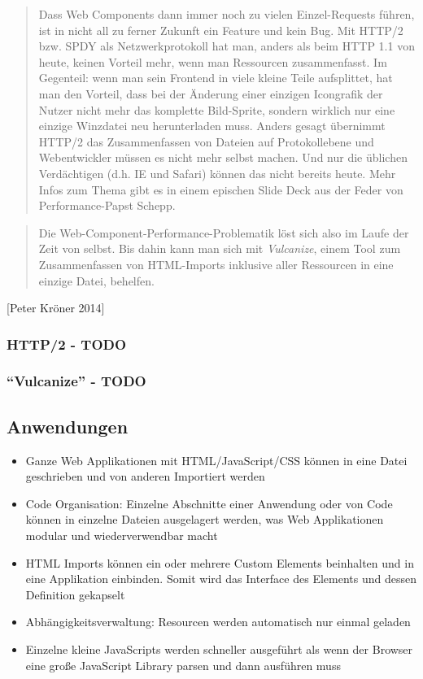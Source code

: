 \begin{quote}
Dass Web Components dann immer noch zu vielen Einzel-Requests führen,
ist in nicht all zu ferner Zukunft ein Feature und kein Bug. Mit HTTP/2
bzw. SPDY als Netzwerkprotokoll hat man, anders als beim HTTP 1.1 von
heute, keinen Vorteil mehr, wenn man Ressourcen zusammenfasst. Im
Gegenteil: wenn man sein Frontend in viele kleine Teile aufsplittet, hat
man den Vorteil, dass bei der Änderung einer einzigen Icongrafik der
Nutzer nicht mehr das komplette Bild-Sprite, sondern wirklich nur eine
einzige Winzdatei neu herunterladen muss. Anders gesagt übernimmt HTTP/2
das Zusammenfassen von Dateien auf Protokollebene und Webentwickler
müssen es nicht mehr selbst machen. Und nur die üblichen Verdächtigen
(d.h. IE und Safari) können das nicht bereits heute. Mehr Infos zum
Thema gibt es in einem epischen Slide Deck aus der Feder von
Performance-Papst Schepp.
\end{quote}

\begin{quote}
Die Web-Component-Performance-Problematik löst sich also im Laufe der
Zeit von selbst. Bis dahin kann man sich mit \emph{Vulcanize}, einem
Tool zum Zusammenfassen von HTML-Imports inklusive aller Ressourcen in
eine einzige Datei, behelfen.
\end{quote}

{[}Peter Kröner 2014{]}

\subsubsection{HTTP/2 - TODO}\label{http2---todo}

\subsubsection{\texorpdfstring{``Vulcanize'' -
TODO}{Vulcanize - TODO}}\label{vulcanize---todo}

\subsection{Anwendungen}\label{anwendungen}

\begin{itemize}
\tightlist
\item
  Ganze Web Applikationen mit HTML/JavaScript/CSS können in eine Datei
  geschrieben und von anderen Importiert werden
\item
  Code Organisation: Einzelne Abschnitte einer Anwendung oder von Code
  können in einzelne Dateien ausgelagert werden, was Web Applikationen
  modular und wiederverwendbar macht
\item
  HTML Imports können ein oder mehrere Custom Elements beinhalten und in
  eine Applikation einbinden. Somit wird das Interface des Elements und
  dessen Definition gekapselt
\item
  Abhängigkeitsverwaltung: Resourcen werden automatisch nur einmal
  geladen
\item
  Einzelne kleine JavaScripts werden schneller ausgeführt als wenn der
  Browser eine große JavaScript Library parsen und dann ausführen muss
\end{itemize}

